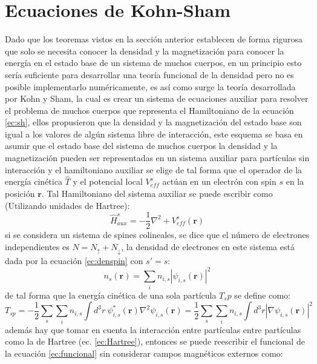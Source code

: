 \documentclass[12pt,a4paper, oneside]{book}
\begin{document}
  \section{Ecuaciones de Kohn-Sham}
  Dado  que los teoremas vistos en la secci\'on anterior establecen de forma rigurosa que solo se necesita conocer la densidad y la magnetizaci\'on para conocer la energ\'ia en el estado base de un sistema de muchos cuerpos, en un principio esto ser\'ia suficiente para desarrollar una teor\'ia funcional de la densidad pero no es posible implementarlo num\'ericamente, es as\'i como surge la teor\'ia desarrollada  por  Kohn y Sham, la cual es crear un sistema de ecuaciones auxiliar para resolver el problema de muchos cuerpos que representa el Hamiltoniano de la ecuaci\'on \ref{ec:sh}, ellos propusieron que la densidad y la magnetizaci\'on del estado base son igual a los valores de alg\'un sistema libre de interacci\'on, este esquema se basa en asumir que el estado base del sistema de muchos cuerpos la densidad y la magnetizaci\'on pueden ser representadas en un sistema auxiliar para part\'iculas sin interacci\'on y el hamiltoniano auxiliar se elige de tal forma que el operador de la energ\'ia cin\'etica $ \hat{T}$ y el potencial local $ V_{eff}^s $ act\'uan en un electr\'on con spin $s$ en la posici\'on $\pmb{r}$. Tal Hamiltoniano del sistema auxiliar se puede escribir como (Utilizando unidades de Hartree):
  \begin{equation}
  \hat{H}_{aux}^{s} = - \frac{1}{2} \nabla^2 + V_{eff}^s (\pmb{r}) \label{ec:HAux}
  \end{equation}  
  si se considera un sistema de spines colineales, se dice que el n\'umero de electrones independientes es $N = N_{\uparrow}+ N_{\downarrow}$, la densidad de electrones en este sistema est\'a dada por la ecuaci\'on \ref{ec:denspin} con $s' = s$:
  \begin{equation}
  n_s (\pmb{r}) = \sum_{i} n_{i,s} |\psi_{i,s } (\pmb{r})|^2 \label{ec:den1spin}
  \end{equation}
  de tal forma que la energ\'ia cin\'etica de una sola part\'icula $T_sp$ se define como:
  \begin{equation}
  T_{sp} = -\frac{1}{2} \sum_{s} \sum_{i} n_{i,s} \int d^3 r ~\psi_{i,s }^* (\pmb{r}) \nabla^2 \psi_{i,s } (\pmb{r})  = \frac{1}{2} \sum_{s} \sum_{i} n_{i,s} \int d^3 r  |\nabla \psi_{i,s } (\pmb{r}) |^2 \label{ec:funCinetica}
  \end{equation}
   adem\'as hay que tomar en cuenta la interacci\'on entre part\'iculas entre part\'iculas como la de Hartree (ec. \ref{ec:Hartree}), entonces se puede reescribir el funcional de la ecuaci\'on \ref{ec:funcional} sin considerar campos magn\'eticos externos como: 
\end{document}
